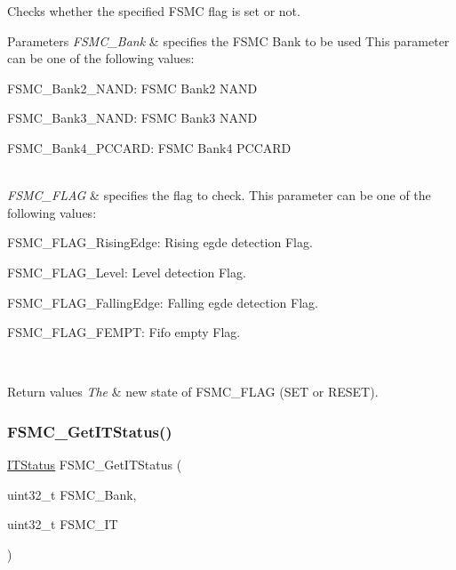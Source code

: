Checks whether the specified F\+S\+MC flag is set or not. 


\begin{DoxyParams}{Parameters}
{\em F\+S\+M\+C\+\_\+\+Bank} & specifies the F\+S\+MC Bank to be used This parameter can be one of the following values\+: \begin{DoxyItemize}
\item F\+S\+M\+C\+\_\+\+Bank2\+\_\+\+N\+A\+ND\+: F\+S\+MC Bank2 N\+A\+ND \item F\+S\+M\+C\+\_\+\+Bank3\+\_\+\+N\+A\+ND\+: F\+S\+MC Bank3 N\+A\+ND \item F\+S\+M\+C\+\_\+\+Bank4\+\_\+\+P\+C\+C\+A\+RD\+: F\+S\+MC Bank4 P\+C\+C\+A\+RD \end{DoxyItemize}
\\
\hline
{\em F\+S\+M\+C\+\_\+\+F\+L\+AG} & specifies the flag to check. This parameter can be one of the following values\+: \begin{DoxyItemize}
\item F\+S\+M\+C\+\_\+\+F\+L\+A\+G\+\_\+\+Rising\+Edge\+: Rising egde detection Flag. \item F\+S\+M\+C\+\_\+\+F\+L\+A\+G\+\_\+\+Level\+: Level detection Flag. \item F\+S\+M\+C\+\_\+\+F\+L\+A\+G\+\_\+\+Falling\+Edge\+: Falling egde detection Flag. \item F\+S\+M\+C\+\_\+\+F\+L\+A\+G\+\_\+\+F\+E\+M\+PT\+: Fifo empty Flag. \end{DoxyItemize}
\\
\hline
\end{DoxyParams}

\begin{DoxyRetVals}{Return values}
{\em The} & new state of F\+S\+M\+C\+\_\+\+F\+L\+AG (S\+ET or R\+E\+S\+ET). \\
\hline
\end{DoxyRetVals}
\mbox{\label{group___f_s_m_c___exported___functions_ga7fce9ca889d33cd8b8b7413875dd4d73}} 
\subsubsection{\texorpdfstring{FSMC\_GetITStatus()}{FSMC\_GetITStatus()}}
{\footnotesize\ttfamily \mbox{\hyperlink{group___exported__types_gaacbd7ed539db0aacd973a0f6eca34074}{I\+T\+Status}} F\+S\+M\+C\+\_\+\+Get\+I\+T\+Status (\begin{DoxyParamCaption}\item[{uint32\+\_\+t}]{F\+S\+M\+C\+\_\+\+Bank,  }\item[{uint32\+\_\+t}]{F\+S\+M\+C\+\_\+\+IT }\end{DoxyParamCaption})}



